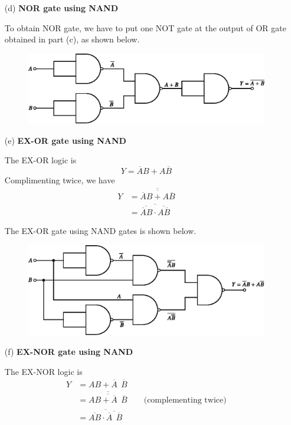 \begin{solution}
\begin{itemize}
\item[(d)] {\bf NOR gate using NAND}

To obtain NOR gate, we have to put one NOT gate at the output of OR gate obtained in part (c), as shown below.
\begin{figure}[H]
\centering
\includegraphics{chap6/fig101.eps}
\end{figure}

\item[(e)] {\bf EX-OR gate using NAND}

The EX-OR logic is
$$
Y=\overline{A}B+A\overline{B}
$$
Complimenting twice, we have
\begin{align*}
Y &= \overline{\overline{\overline{A}B+A\overline{B}}}\\[3pt]
  &= \overline{\overline{\overline{A}B}\cdot \overline{A\overline{B}}}
\end{align*}

The EX-OR gate using NAND gates is shown below.
\begin{figure}[H]
\centering
\includegraphics{chap6/fig102.eps}
\end{figure}

\eject

\item[(f)] {\bf EX-NOR gate using NAND}

The EX-NOR logic is
\begin{align*}
Y &= AB+\overline{A} \ \ \overline{B}\\[3pt]
&= \overline{\overline{AB+\overline{A} \ \ \overline{B}}}\qquad \text{(complementing twice)}\\[3pt]
&= \overline{\overline{AB}\cdot \overline{\overline{A} \ \ \overline{B}}}
\end{align*}


\end{itemize}
\end{solution}
